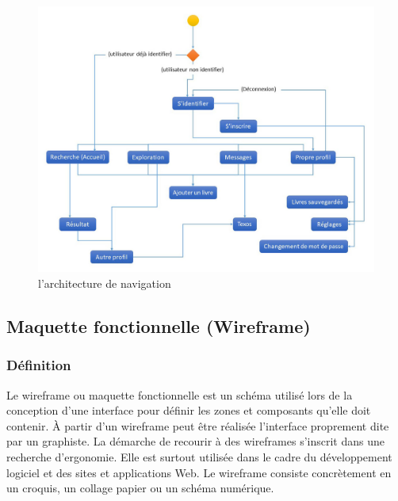 \begin{figure}[h]
	\begin{center}
		\includegraphics[width=14cm]{Images/chapter3/diagramme_de_navigation.jpg}
		\caption{{\footnotesize l'architecture de navigation}}
	\end{center}
\end{figure}

\newpage
\subsection{Maquette fonctionnelle (Wireframe)}
\subsubsection{Définition}
Le wireframe ou maquette fonctionnelle est un schéma utilisé lors de la conception d'une interface pour définir les zones et composants qu'elle doit contenir. À partir d'un wireframe peut être réalisée l'interface proprement dite par un graphiste. La démarche de recourir à des wireframes s'inscrit dans une recherche d'ergonomie. Elle est surtout utilisée dans le cadre du développement logiciel et des sites et applications Web. Le wireframe consiste concrètement en un croquis, un collage papier ou un schéma numérique\cite{noauthor_wireframe_nodate}.


